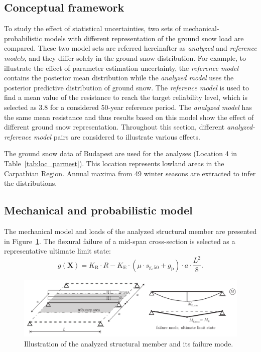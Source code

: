 \subsection{Conceptual framework}
To study the effect of statistical uncertainties, two sets of mechanical-probabilistic models with different representation of the ground snow load are compared. These two model sets are referred hereinafter as \textit{analyzed} and \textit{reference models}, and they differ solely in the ground snow distribution. For example, to illustrate the effect of parameter estimation uncertainty, the \textit{reference model} contains the posterior mean distribution while the \textit{analyzed model} uses the posterior predictive distribution of ground snow. The \textit{reference model} is used to find a mean value of the resistance to reach the target reliability level, which is selected as 3.8 for a considered 50-year reference period. The \textit{analyzed model} has the same mean resistance and thus results based on this model show the effect of different ground snow representation. Throughout this section, different \textit{analyzed-reference model} pairs are considered to illustrate various effects.

The ground snow data of Budapest are used for the analyses (Location 4 in Table~\ref{tab:loc_parmest}). This location  represents lowland areas in the Carpathian Region. Annual maxima from 49 winter seasons are extracted to infer the distributions.

\subsection{Mechanical and probabilistic model} 

The mechanical model and loads of the analyzed structural member are presented in Figure~\ref{fig:beam_illustration}. The flexural failure of a mid-span cross-section is selected as a representative ultimate limit state:
\begin{equation}
	g(\mathbf{X}) = {K_{\mathrm{R}}} \cdot R - {K_{\mathrm{E}}} \cdot \left( {\mu  \cdot {s_{{\mathrm{g,50}}}} + {g_{\mathrm{p}}}} \right) \cdot a \cdot \frac{{{L^2}}}{8}.
\end{equation}

\begin{figure}[htbp!]
	\centering    
	\includegraphics[width = 1\textwidth]{beam_illustration.pdf}
	\caption{Illustration of the analyzed structural member and its failure mode.}
	\label{fig:beam_illustration}
\end{figure}

